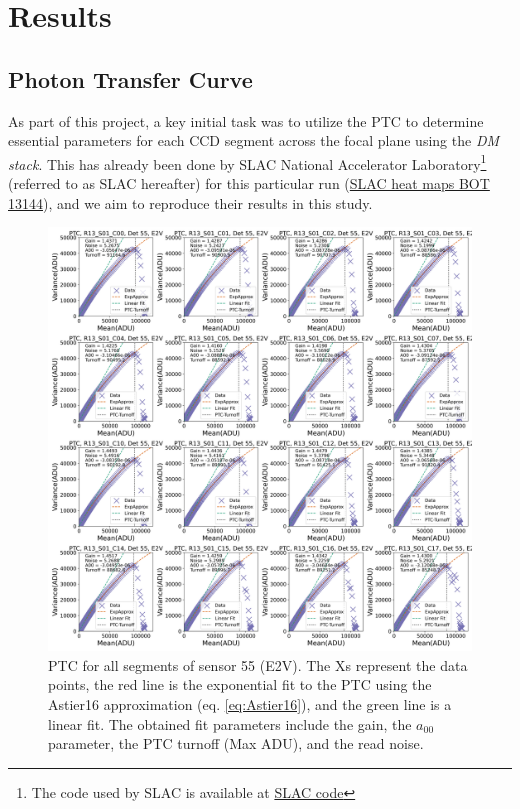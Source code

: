 \section{Results} \label{sec:results}


\subsection{Photon Transfer Curve}

As part of this project, a key initial task was to utilize the PTC to determine essential parameters for each CCD segment across the focal plane using the \textit{DM stack}. This has already been done by SLAC National Accelerator Laboratory\footnote{The code used by SLAC is available at \href{https://github.com/lsst-camera-dh/eotest/blob/32c17b0a33b9c099651ed581ee90c1b1101012fb/python/lsst/eotest/sensor/ptcTask.py}{SLAC code}} (referred to as SLAC hereafter) for this particular run (\href{https://srs.slac.stanford.edu/BOT_EO_Reports/13144/}{SLAC heat maps BOT 13144}), and we aim to reproduce their results in this study.

\vspace{3mm}


\begin{figure}[!htb]
    \centering
    \includegraphics[width=\textwidth]{Figures/PTC_Detector55.png}
    \caption{PTC for all segments of sensor 55 (E2V). The Xs represent the data points, the red line is the exponential fit to the PTC using the Astier16 approximation (eq. \ref{eq:Astier16}), and the green line is a linear fit. The obtained fit parameters include the gain, the $a_{00}$ parameter, the PTC turnoff (Max ADU), and the read noise.}
    \label{fig:PTC_55}
\end{figure}

